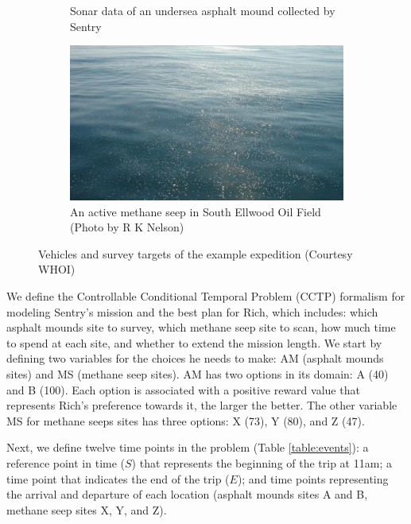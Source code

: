 \documentclass[jair,twoside,11pt,theapa]{article}
\begin{document}
\begin{figure}[ht!]
\begin{subfigure}[b]{0.45\textwidth}
	     \caption{Sonar data of an undersea asphalt mound collected by Sentry}
		 \label{fig:asphalt_domes}
	 \end{subfigure}
	 \begin{subfigure}[b]{0.45\textwidth}
		 \centering	    
	    \includegraphics[width=\textwidth]{figures/methane_seeps.pdf}
	    \caption{An active methane seep in South Ellwood Oil Field (Photo by R K Nelson)}
	    \label{fig:methane_seeps}
	 \end{subfigure}
    \caption{Vehicles and survey targets of the example expedition (Courtesy WHOI)}
   	\label{fig:background_images}

\end{figure}


%


We define the Controllable Conditional Temporal Problem (CCTP) formalism for
modeling Sentry's mission and the best plan for Rich, which includes: which
asphalt mounds site to survey, which methane seep site to scan, how much time to
spend at each site, and whether to extend the mission length. We start by
defining two variables for the choices he needs to make: AM (asphalt mounds
sites) and MS (methane seep sites). AM has two options in its domain: A (40) and
B (100). Each option is associated with a positive reward value that represents
Rich's preference towards it, the larger the better. The other variable MS for
methane seeps sites has three options: X (73), Y (80), and Z (47).


Next, we define twelve time points in the problem (Table \ref{table:events}): a
reference point in time ($S$) that represents the beginning of the trip at 11am;
a time point that indicates the end of the trip ($E$); and time points
representing the arrival and departure of each location (asphalt mounds sites A
and B, methane seep sites X, Y, and Z).
\end{document}
